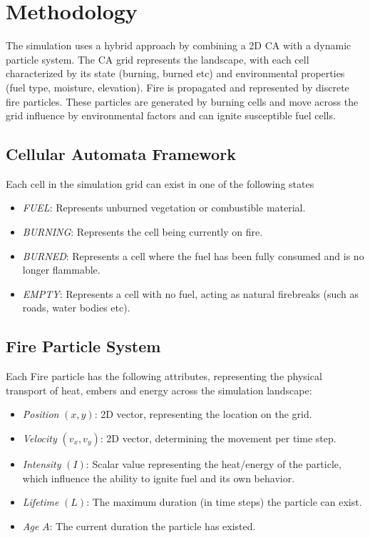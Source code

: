 \section{Methodology}
The simulation uses a hybrid approach by combining a 2D CA with a dynamic particle system. The CA grid represents the landscape, with each cell characterized by its state (burning, burned etc) and environmental properties (fuel type, moisture, elevation). Fire is propagated and represented by discrete fire particles. These particles are generated by burning cells and move across the grid influence by environmental factors and can ignite susceptible fuel cells.

\subsection{Cellular Automata Framework}
Each cell in the simulation grid can exist in one of the following states
\begin{itemize}
	\item \textit{FUEL}: Represents unburned vegetation or combustible material.
	\item \textit{BURNING}: Represents the cell being currently on fire.
	\item \textit{BURNED}: Represents a cell where the fuel has been fully consumed and is no longer flammable.
	\item \textit{EMPTY}: Represents a cell with no fuel, acting as natural firebreaks (such as roads, water bodies etc).
\end{itemize}
\subsection{Fire Particle System}
Each Fire particle has the following attributes, representing the physical transport of heat, embers and energy across the simulation landscape:
\begin{itemize}
	\item \textit{Position} $(x, y)$: 2D vector, representing the location on the grid.
	\item \textit{Velocity} $(v_x, v_y)$: 2D vector, determining  the movement per time step.
	\item \textit{Intensity} $(I)$: Scalar value representing the heat/energy of the particle, which influence the ability to ignite fuel and its own behavior.
	\item \textit{Lifetime} $(L)$: The maximum duration (in time steps) the particle can exist.
	\item \textit{Age} $A$: The current duration the particle has existed.
\end{itemize}

